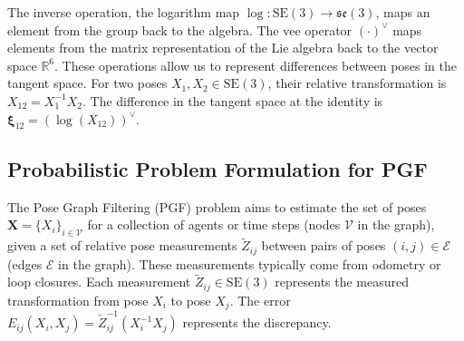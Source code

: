The inverse operation, the logarithm map $\log: \text{SE}(3) \to {\mathfrak{se}}(3)$, maps an element from the group back to the algebra. The vee operator $(\cdot)^{\vee}$ maps elements from the matrix representation of the Lie algebra back to the vector space ${\mathbb{R}}^6$. These operations allow us to represent differences between poses in the tangent space. For two poses $X_1, X_2 \in \text{SE}(3)$, their relative transformation is $X_{12} = X_1^{-1} X_2$. The difference in the tangent space at the identity is $\boldsymbol{\xi}_{12} = (\log(X_{12}))^{\vee}$.

\subsection{Probabilistic Problem Formulation for PGF}
\label{subsec:probabilistic_pgo}

The Pose Graph Filtering (PGF) problem aims to estimate the set of poses ${\mathbf{X}} = \{X_i\}_{i \in {\mathcal{V}}}$ for a collection of agents or time steps (nodes ${\mathcal{V}}$ in the graph), given a set of relative pose measurements ${\tilde{Z}}_{ij}$ between pairs of poses $(i, j) \in {\mathcal{E}}$ (edges ${\mathcal{E}}$ in the graph). These measurements typically come from odometry or loop closures. Each measurement ${\tilde{Z}}_{ij} \in \text{SE}(3)$ represents the measured transformation from pose $X_i$ to pose $X_j$. The error $E_{ij}(X_i, X_j) = {\tilde{Z}}_{ij}^{-1} (X_i^{-1} X_j)$ represents the discrepancy.

